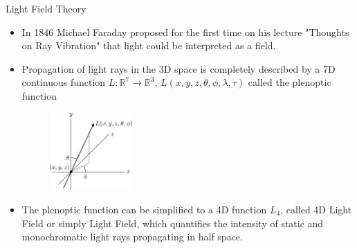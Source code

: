 \begin{frame}{Light Field Theory}
\begin{block}{}
\begin{itemize}

\item In 1846 Michael Faraday proposed for the first time on his lecture "Thoughts on Ray Vibration" that light could be interpreted as a field.

\pause

\item Propagation of light rays in the 3D space is completely described by a 7D continuous function $L:\mathbb{R}^7\longrightarrow \mathbb{R}^3$, $L(x,y,z,\theta,\phi, \lambda, \tau)$ called the plenoptic function

\pause
\begin{figure}[h!]
\centering
\includegraphics[width=0.3\textwidth]{../../Diagrams/Plenoptic_function.jpg}
\end{figure}

\pause

\item The plenoptic function can be simplified to a 4D function $L_4$, called 4D Light Field or simply Light Field, which quantifies the intensity of static and monochromatic light rays propagating in half space. 
\end{itemize}
\end{block}
\end{frame}

